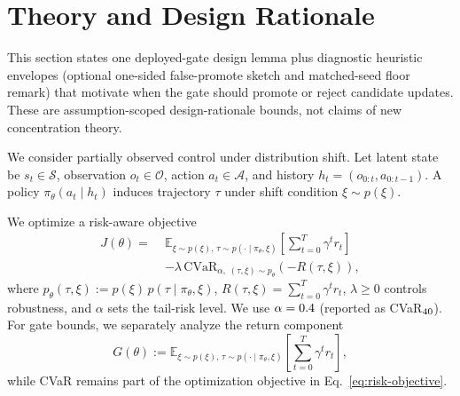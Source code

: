 \documentclass[letterpaper,10pt,conference]{ieeeconf}
\begin{document}
\section{Theory and Design Rationale}
This section states one deployed-gate design lemma plus diagnostic heuristic envelopes (optional one-sided false-promote sketch and matched-seed floor remark) that motivate when the gate should promote or reject candidate updates. These are assumption-scoped design-rationale bounds, not claims of new concentration theory.

We consider partially observed control under distribution shift. Let latent state be $s_t \in \mathcal{S}$, observation $o_t \in \mathcal{O}$, action $a_t \in \mathcal{A}$, and history $h_t=(o_{0:t},a_{0:t-1})$. A policy $\pi_\theta(a_t\mid h_t)$ induces trajectory $\tau$ under shift condition $\xi \sim p(\xi)$.

We optimize a risk-aware objective
\begin{equation}
\begin{aligned}
J(\theta) =\;& \mathbb{E}_{\xi \sim p(\xi),\,\tau \sim p(\cdot \mid \pi_\theta,\xi)}\!\left[\sum_{t=0}^{T} \gamma^t r_t\right] \\
&- \lambda\,\mathrm{CVaR}_{\alpha,\;(\tau,\xi)\sim p_\theta}\!\left(-R(\tau,\xi)\right),
\end{aligned}
\label{eq:risk-objective}
\end{equation}
where $p_\theta(\tau,\xi):=p(\xi)\,p(\tau\mid\pi_\theta,\xi)$, $R(\tau,\xi)=\sum_{t=0}^{T}\gamma^t r_t$, $\lambda\ge 0$ controls robustness, and $\alpha$ sets the tail-risk level. We use $\alpha=0.4$ (reported as CVaR$_{40}$).
For gate bounds, we separately analyze the return component
\[
G(\theta):=\mathbb{E}_{\xi\sim p(\xi),\,\tau\sim p(\cdot\mid\pi_\theta,\xi)}\!\left[\sum_{t=0}^{T}\gamma^t r_t\right],
\]
while CVaR remains part of the optimization objective in Eq.~\ref{eq:risk-objective}.
\end{document}
